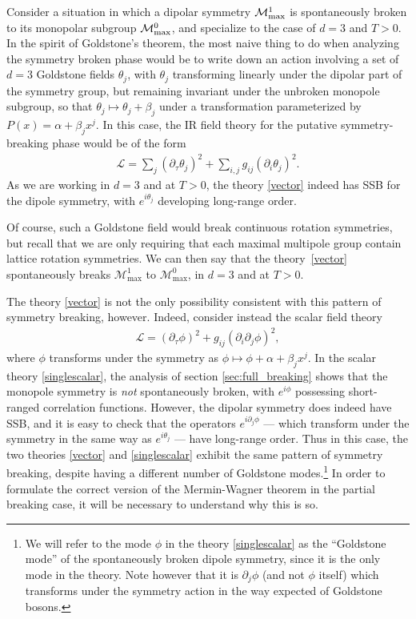 \documentclass[prb,aps,twocolumn, amsfonts,amsmath,amssymb,nofootinbib,superscriptaddress]{revtex4-2}
\renewcommand{\max}{\text{max}}
\newcommand{\mmax}[1]{\mathcal{M}^{#1}_\max}
\newcommand{\p}{\partial}
\renewcommand{\t}{\theta}
\newcommand{\mcm}{\mathcal{M}}
\begin{document}
Consider a situation in which a dipolar symmetry $\mcm^1_{\rm max}$ is spontaneously broken to its monopolar subgroup $\mcm^0_{\rm max}$, and specialize to the case of $d=3$ and $T>0$. In the spirit of Goldstone's theorem, the most naive thing to do when analyzing the symmetry broken phase would be to write down an action involving a set of $d=3$ Goldstone fields $\theta_j$, with $\t_j$ transforming linearly under the dipolar part of the symmetry group, but remaining invariant under the unbroken monopole subgroup, so that $\theta_j \mapsto \theta_j + \beta_j$ under a transformation parameterized by $P(x) = \alpha + \beta_j x^j$. In this case, the IR field theory for the putative symmetry-breaking phase would be of the form 
\begin{align}
\label{vector} \mathcal{L}= \sum_j  (\partial_\tau \theta_j)^2 + \sum_{i,j} g_{ij} (\partial_i \theta_j)^2.
\end{align}
As we are working in $d=3$ and at $T>0$, the theory \eqref{vector} indeed has SSB for the dipole symmetry, with $e^{i\t_j}$ developing long-range order. 

Of course, such a Goldstone field would break continuous rotation symmetries, but recall that we are only requiring that each maximal multipole group contain lattice rotation symmetries. We can then say that the theory~\eqref{vector} spontaneously breaks $\mmax{1}$ to $\mmax{0}$, in $d=3$ and at $T>0$.

The theory \eqref{vector} is not the only possibility consistent with this pattern of symmetry breaking, however. Indeed, consider instead the scalar field theory 
\begin{align}
\label{singlescalar}    \mathcal{L} = (\partial_\tau\phi)^2 + g_{ij} (\partial_i\partial_j\phi)^2, \end{align}
where $\phi$ transforms under the symmetry as $\phi \mapsto \phi + \alpha + \beta_jx^j$. 
 In the scalar theory \eqref{singlescalar}, the analysis of section \ref{sec:full_breaking} shows that the monopole symmetry is {\it not} spontaneously broken, with $e^{i\phi}$ possessing short-ranged correlation functions. However, the dipolar symmetry does indeed have SSB, and it is easy to check that the operators $e^{i\p_j\phi}$ --- which transform under the symmetry in the same way as $e^{i\t_j}$ --- have long-range order. Thus in this case, the two theories \eqref{vector} and \eqref{singlescalar} exhibit the same pattern of symmetry breaking, despite having a different number of Goldstone modes.\footnote{We will refer to the mode $\phi$ in the theory \eqref{singlescalar} as the ``Goldstone mode'' of the spontaneously broken dipole symmetry, since it is the only mode in the theory. Note however that it is $\p_j\phi$ (and not $\phi$ itself) which transforms under the symmetry action in the way expected of Goldstone bosons.} In order to formulate the correct version of the Mermin-Wagner theorem in the partial breaking case, it will be necessary to understand why this is so.  
\end{document}
